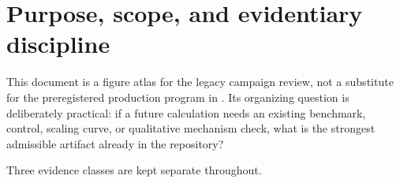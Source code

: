 \documentclass[aps,prb,twocolumn,floatfix,nofootinbib,superscriptaddress]{revtex4-2}
\newcommand{\subfolder}[1]{\path{#1}}
\begin{document}
\begin{abstract}
available circumferences and shell depths, matched to the independently extracted entropy
coefficient on the same ensembles.
An independent deterministic form-factor reconstruction further shows that the practical
$n_{\rm shell}=1$ three-by-three OW mode retains $99.2155\%$ of its unwindowed norm and
preserves the target-band overlap winding, even though the associated smooth
compact-support spinor is necessarily Chern trivial.
A four-point mass sweep then verifies the bundle statement directly: unwindowed and
$n_{\rm shell}=0,1,2$ overlaps all have total winding $-1$ in the $C=1$ phase at
$\alpha=1,1.5$, while all are gapped with zero winding in the trivial phase at
$\alpha=3,30$.
An exact deterministic CPU reconstruction finally separates the autonomous finite-success
mean channel from its continuous weak-success generator.  The untruncated controller has
paired wall-localized occupation branches through half filling, while all three shell
choices retain an extensively mixed interface sector and show second-order fixed-time
channel-to-generator convergence.
Every figure is generated by one documented Jupyter notebook, and every panel is
tied to an explicit source manifest and a machine-readable diagnostic ledger.
\end{abstract}

\maketitle
\setcounter{tocdepth}{2}
\tableofcontents

\section{Purpose, scope, and evidentiary discipline}

This document is a figure atlas for the legacy campaign review, not a substitute for the
preregistered production program in \subfolder{experiment_review/}.  Its organizing
question is deliberately practical: if a future calculation needs an existing benchmark,
control, scaling curve, or qualitative mechanism check, what is the strongest admissible
artifact already in the repository?

Three evidence classes are kept separate throughout.
\end{document}
